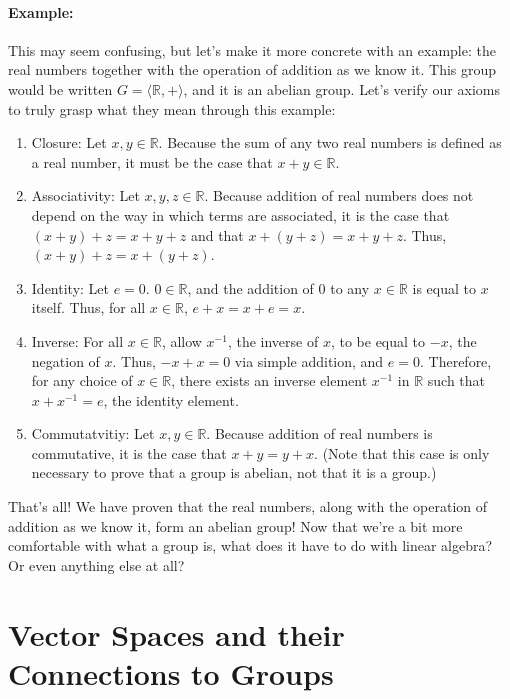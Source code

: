 \documentclass[twoside]{article}
\newcommand{\R}{\mathbb{R}}
\begin{document}
\paragraph*{Example:}
This may seem confusing, but let's make it more concrete with an example: 
the real numbers together with the operation of addition as we know it. This 
group would be written $G = \langle \R, +\rangle$, and it is an abelian group. 
Let's verify our axioms 
to truly grasp what they mean through this example:
\begin{enumerate}
    \item Closure: Let $x,y\in\R$. Because the sum of any two real numbers 
    is defined as a real number, it must be the case that $x+y\in\R$. 
    \item Associativity: Let $x,y,z\in\R$. Because addition of real numbers 
    does not depend on the way in which terms are associated, it is the case 
    that $(x+y)+z = x+y+z$ and that $x+(y+z)=x+y+z$. Thus, $(x+y)+z=x+(y+z)$. 
    \item Identity: Let $e = 0$. $0\in\R$, and the addition of 0 to any $x\in\R$
    is equal to $x$ itself. Thus, for all $x\in\R$, $e+x=x+e=x$. 
    \item Inverse: For all $x\in\R$, allow $x^{-1}$, the inverse of $x$, to be equal 
    to $-x$, the negation of $x$. Thus, $-x+x=0$ via simple addition, and $e=0$.
    Therefore, for any choice of $x\in\R$, there exists an inverse element $x^{-1}$ in $\R$
    such that $x+ x^{-1} =e$, the identity element. 
    \item Commutatvitiy: Let $x,y\in\R$. Because addition of real numbers is commutative,
    it is the case that $x+y=y+x$. (Note that this case is only necessary to 
    prove that a group is abelian, not that it is a group.)
\end{enumerate}
That's all! We have proven that the real numbers, along with the operation of 
addition as we know it, form an abelian group! Now that we're a bit more comfortable with 
what a group is, what does it have to do with linear algebra? Or even anything 
else at all?

\section{Vector Spaces and their Connections to Groups}
\end{document}
